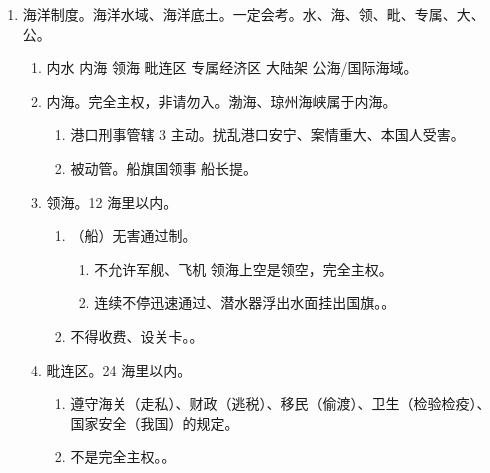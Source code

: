 \begin{enumerate}
        \begin{kk}{限制}
          \begin{enumerate}
            \item 一般限制。领海无害通过、外交特权与豁免……
            \item 特殊限制。共管、租界、国际地役、势力范围。是否合法取决于据以产生的条约是否合法。
          \end{enumerate}
        \end{kk}
  \item 海洋制度。海洋水域、海洋底土。一定会考。水、海、领、毗、专属、大、公。
        \begin{enumerate}
          \item 内水 \yjt 内海 \yjt 领海 \yjt 毗连区 \yjt 专属经济区 \yjt 大陆架 \yjt 公海/国际海域。
          \item 内海。完全主权，非请勿入。渤海、琼州海峡属于内海。
                \begin{enumerate}
                  \item 港口刑事管辖 3 主动。扰乱港口安宁、案情重大、本国人受害。
                  \item 被动管。船旗国领事 \hz 船长提。
                \end{enumerate}
          \item 领海。12 海里以内。
                \begin{enumerate}
                  \item （船）无害通过制。
                        \begin{enumerate}
                          \item 不允许军舰、飞机 \yjt 领海上空是领空，完全主权。
                          \item 连续不停迅速通过、潜水器浮出水面挂出国旗。。
                        \end{enumerate}
                  \item 不得收费、设关卡。。
                \end{enumerate}
          \item 毗连区。24 海里以内。
                \begin{enumerate}
                  \item 遵守海关（走私）、财政（逃税）、移民（偷渡）、卫生（检验检疫）、国家安全（我国）的规定。
                  \item 不是完全主权。。

\end{enumerate}
\end{enumerate}
\end{enumerate}
